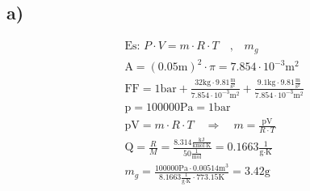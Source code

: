 

\subsection*{a)}
\begin{align*}
&\text{Es: } P \cdot V = m \cdot R \cdot T \quad \text{,} \quad m_g \\
&\text{A} = (0.05 \text{m})^2 \cdot \pi = 7.854 \cdot 10^{-3} \text{m}^2 \\
&\text{FF} = 1 \text{bar} + \frac{32 \text{kg} \cdot 9.81 \frac{\text{m}}{\text{s}^2}}{7.854 \cdot 10^{-3} \text{m}^2} + \frac{9.1 \text{kg} \cdot 9.81 \frac{\text{m}}{\text{s}^2}}{7.854 \cdot 10^{-3} \text{m}^2} \\
&\text{p} = 100000 \text{Pa} = 1 \text{bar} \\
&\text{pV} = m \cdot R \cdot T \quad \Rightarrow \quad m = \frac{\text{pV}}{R \cdot T} \\
&\text{Q} = \frac{R}{M} = \frac{8.314 \frac{\text{kJ}}{\text{kmol} \cdot \text{K}}}{50 \frac{1}{\text{mol}}} = 0.1663 \frac{1}{\text{g} \cdot \text{K}} \\
&m_g = \frac{100000 \text{Pa} \cdot 0.00514 \text{m}^3}{8.1663 \frac{1}{\text{g} \cdot \text{K}} \cdot 773.15 \text{K}} = 3.42 \text{g}
\end{align*}